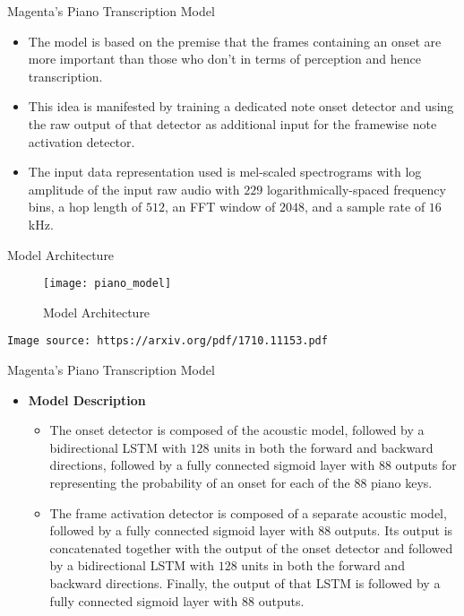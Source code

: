 \begin{frame}[t,fragile]{Magenta's Piano Transcription Model}
\begin{itemize}
\item The model is based on the premise that the frames containing an onset are more important than those who don't in terms of perception and hence transcription.

\item This idea is manifested by training a dedicated note onset detector and using the raw output of that detector as additional input for the framewise note activation detector. 

\item The input data representation used is mel-scaled spectrograms with log amplitude of the input raw audio with $229$ logarithmically-spaced frequency bins, a hop length of $512$, an FFT window of $2048$, and a sample rate of $16$kHz. 



\end{itemize}
\end{frame}
\begin{frame}[t,fragile]{Model Architecture}
\begin{figure}[h!]
  \texttt{[image: piano\_model]}
  \caption{Model Architecture}
  \label{}
\end{figure}
\tiny{\texttt{Image source: https://arxiv.org/pdf/1710.11153.pdf}}
\end{frame}


\begin{frame}[t,fragile]{Magenta's Piano Transcription Model}
\begin{itemize}

\item \textbf{Model Description}
  \begin{itemize}
    \item The onset detector is composed of the acoustic model, followed by a bidirectional LSTM with $128$ units in both the forward and backward directions, followed by a fully connected sigmoid layer with $88$ outputs for representing the probability of an onset for each of the $88$ piano keys.

    \item The frame activation detector is composed of a separate acoustic model, followed by a fully connected sigmoid layer with $88$ outputs. Its output is concatenated together with the output of the onset detector and followed by a bidirectional LSTM with $128$ units in both the forward and backward directions. Finally, the output of that LSTM is followed by a fully connected sigmoid layer with $88$ outputs. 
  \end{itemize}

\end{itemize}
\end{frame}


